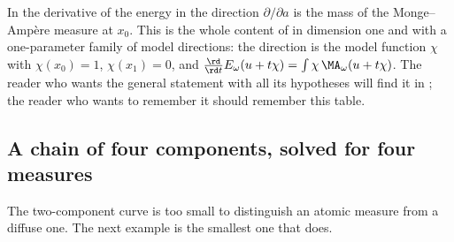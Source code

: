 \begin{remark}
\label{rem:ch31-two-component-derivative}
In  the derivative of the energy in the
direction \(\partial/\partial a\) is the mass of the Monge--Amp\`ere measure
at \(x_0\).  This is the whole content of
 in dimension one and with a
one-parameter family of model directions: the direction is the model
function \(\chi\) with \(\chi(x_0)=1\), \(\chi(x_1)=0\), and
\(\frac{\rd}{\rd t}E_\omega(u+t\chi)=\int\chi\,\MA_\omega(u+t\chi)\).
The reader who wants the general statement with all its hypotheses will
find it in ; the reader who wants to remember it
should remember this table.
\end{remark}

\subsection{A chain of four components, solved for four measures}
\label{sec:ch31-chain}

The two-component curve is too small to distinguish an atomic measure from a
diffuse one.  The next example is the smallest one that does.

